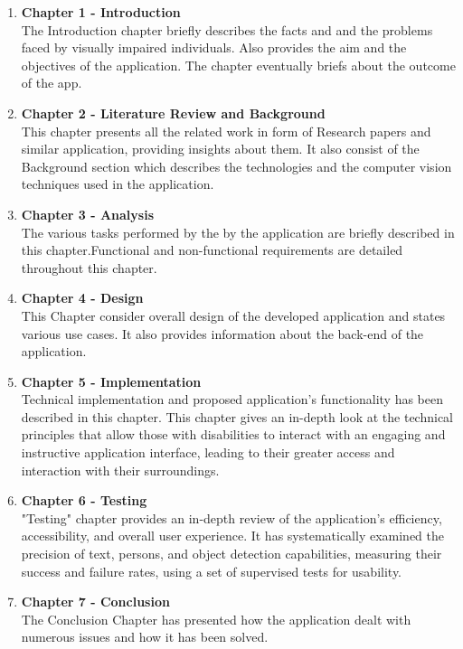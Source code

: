 \documentclass[MScCS]{uccthesis}
\begin{document}
   \begin{enumerate}
       \item \textbf{Chapter 1 - Introduction }\\
       The Introduction chapter briefly describes the facts and and the problems faced by visually impaired individuals. Also provides the aim and the objectives of the application. The chapter eventually briefs about the outcome of the app.
       \item \textbf{Chapter 2 - Literature Review and Background}\\
       This chapter presents all the related work in form of Research papers and similar application, providing insights about them. It also consist of the Background section which describes the technologies and the computer vision techniques used in the application.
       \item \textbf{Chapter 3 - Analysis}\\
       The various tasks performed by the by the application are briefly described in this chapter.Functional and non-functional requirements are detailed throughout this chapter.
       \item \textbf{Chapter 4 - Design}\\
       This Chapter consider overall design of the developed application and states various use cases. It also provides information about the back-end of the application.
       \item \textbf{Chapter 5 - Implementation}\\
       Technical implementation and proposed application's functionality has been described in this chapter. This chapter gives an in-depth look at the technical principles that allow those with disabilities to interact with an engaging and instructive application interface, leading to their greater access and interaction with their surroundings.
       \item \textbf{Chapter 6 - Testing}\\
       "Testing" chapter provides an in-depth review of the application's efficiency, accessibility, and overall user experience. It has systematically examined the precision of text, persons, and object detection capabilities, measuring their success and failure rates, using a set of supervised tests for usability.
       \item \textbf{Chapter 7 - Conclusion}\\
       The Conclusion Chapter has presented how the application dealt with numerous issues and how it has been solved.
   \end{enumerate}
\end{document}

